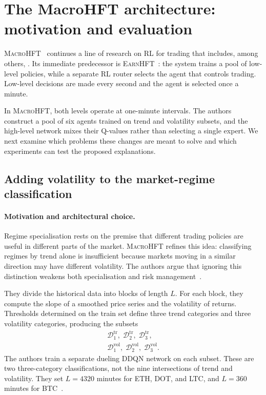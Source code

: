 \documentclass[9pt,a4paper,twocolumn]{extarticle}
\newcommand{\Macro}{\textsc{MacroHFT}}
\newcommand{\Earn}{\textsc{EarnHFT}}
\begin{document}
\section{The MacroHFT architecture: motivation and evaluation}
\label{sec:method}

\Macro{}~\cite{zong2024macrohft} continues a line of research on RL for trading that includes,
among others, \cite{deng2016deep,theate2021trading,zhu2022perturbation}. Its immediate predecessor
is \Earn{}~\cite{qin2024earnhft}: the system trains a pool of low-level policies, while a separate
RL router selects the agent that controls trading. Low-level decisions are made every second and
the agent is selected once a minute.

In \Macro{}, both levels operate at one-minute intervals. The authors construct a pool of six
agents trained on trend and volatility subsets, and the high-level network mixes their Q-values
rather than selecting a single expert. We next examine which problems these changes are meant to
solve and which experiments can test the proposed explanations.

\subsection{Adding volatility to the market-regime classification}
\label{sec:regime_decomposition}

\paragraph{Motivation and architectural choice.}

Regime specialisation rests on the premise that different trading policies are useful in
different parts of the market. \Macro{} refines this idea: classifying regimes by trend alone is
insufficient because markets moving in a similar direction may have different volatility. The
authors argue that ignoring this distinction weakens both specialisation and risk
management~\cite{zong2024macrohft}.

They divide the historical data into blocks of length $L$. For each block, they compute the slope
of a smoothed price series and the volatility of returns. Thresholds determined on the train set
define three trend categories and three volatility categories, producing the subsets
\begin{equation}
\begin{aligned}
  \mathcal D^{\mathrm{tr}}_1,\;
  \mathcal D^{\mathrm{tr}}_2,\;
  \mathcal D^{\mathrm{tr}}_3,\\
  \mathcal D^{\mathrm{vol}}_1,\;
  \mathcal D^{\mathrm{vol}}_2,\;
  \mathcal D^{\mathrm{vol}}_3.
\end{aligned}
\label{eq:regime_subsets}
\end{equation}
The authors train a separate dueling DDQN network on each subset. These are two three-category
classifications, not the nine intersections of trend and volatility. They set $L=4320$ minutes
for ETH, DOT, and LTC, and $L=360$ minutes for BTC~\cite{zong2024macrohft}.
\end{document}

